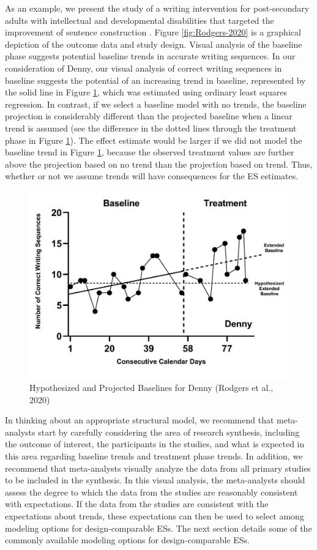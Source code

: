 \documentclass[
]{book}
\begin{document}
As an example, we present the study of a writing intervention for post-secondary adults with intellectual and developmental disabilities that targeted the improvement of sentence construction \citep{rodgers2021Effects}. Figure \ref{fig:Rodgers-2020} is a graphical depiction of the outcome data and study design. Visual analysis of the baseline phase suggests potential baseline trends in accurate writing sequences. In our consideration of Denny, our visual analysis of correct writing sequences in baseline suggests the potential of an increasing trend in baseline, represented by the solid line in Figure \ref{fig:Rodgers-2020-Denny}, which was estimated using ordinary least squares regression. In contrast, if we select a baseline model with no trends, the baseline projection is considerably different than the projected baseline when a linear trend is assumed (see the difference in the dotted lines through the treatment phase in Figure \ref{fig:Rodgers-2020-Denny}). The effect estimate would be larger if we did not model the baseline trend in Figure \ref{fig:Rodgers-2020-Denny}, because the observed treatment values are further above the projection based on no trend than the projection based on trend. Thus, whether or not we assume trends will have consequences for the ES estimates.

\begin{figure}
\includegraphics[width=0.75\linewidth]{images/Rodgers-2020-Denny} \caption{Hypothesized and Projected Baselines for Denny (Rodgers et al., 2020)}\label{fig:Rodgers-2020-Denny}
\end{figure}

In thinking about an appropriate structural model, we recommend that meta-analysts start by carefully considering the area of research synthesis, including the outcome of interest, the participants in the studies, and what is expected in this area regarding baseline trends and treatment phase trends. In addition, we recommend that meta-analysts visually analyze the data from all primary studies to be included in the synthesis. In this visual analysis, the meta-analysts should assess the degree to which the data from the studies are reasonably consistent with expectations. If the data from the studies are consistent with the expectations about trends, these expectations can then be used to select among modeling options for design-comparable ESs. The next section details some of the commonly available modeling options for design-comparable ESs.
\end{document}
